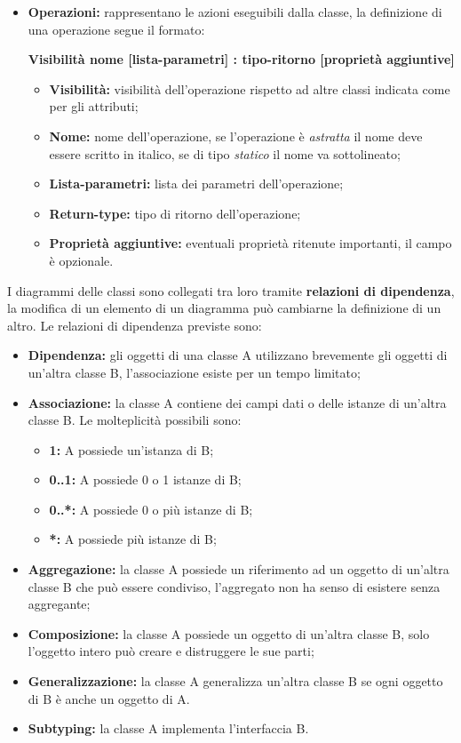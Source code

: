 \begin{itemize}
	\item \textbf{Operazioni:} rappresentano le azioni eseguibili dalla classe, la definizione di una operazione segue il formato:
	\begin{center}
		\textbf{Visibilità nome [lista-parametri] : tipo-ritorno [proprietà aggiuntive]}
	\end{center}
	\begin{itemize}
		\item \textbf{Visibilità:} visibilità dell'operazione rispetto ad altre classi indicata come per gli attributi;
		\item \textbf{Nome:} nome dell'operazione, se l'operazione è \textit{astratta} il nome deve essere scritto in italico, se di tipo \textit{statico} il nome va sottolineato;
		\item \textbf{Lista-parametri:} lista dei parametri dell'operazione; 
		\item \textbf{Return-type:} tipo di ritorno dell'operazione;
		\item \textbf{Proprietà aggiuntive:} eventuali proprietà ritenute importanti, il campo è opzionale.
	\end{itemize}
\end{itemize}
I diagrammi delle classi sono collegati tra loro tramite \textbf{relazioni di dipendenza}, la modifica di un elemento di un diagramma può cambiarne la definizione di un altro.
Le relazioni di dipendenza previste sono:
	\begin{itemize}
		\item \textbf{Dipendenza:} gli oggetti di una classe A utilizzano brevemente gli oggetti di un'altra classe B, l'associazione esiste per un tempo limitato;
		\item \textbf{Associazione:} la classe A contiene dei campi dati o delle istanze di un'altra classe B. Le molteplicità possibili sono:
		\begin{itemize}
			\item \textbf{1:} A possiede un'istanza di B;
			\item \textbf{0..1:} A possiede 0 o 1 istanze di B;
			\item \textbf{0..*:} A possiede 0 o più istanze di B;
			\item \textbf{*:} A possiede più istanze di B;
		\end{itemize}
		\item \textbf{Aggregazione:} la classe A possiede un riferimento ad un oggetto di un'altra classe B che può essere condiviso, l'aggregato non ha senso di esistere senza aggregante;
		\item \textbf{Composizione:} la classe A possiede un oggetto di un'altra classe B, solo l'oggetto intero può creare e distruggere le sue parti;
		\item \textbf{Generalizzazione:} la classe A generalizza un'altra classe B se ogni oggetto di B è anche un oggetto di A.
		\item \textbf{Subtyping:}  la classe A implementa l'interfaccia B.
	\end{itemize}

